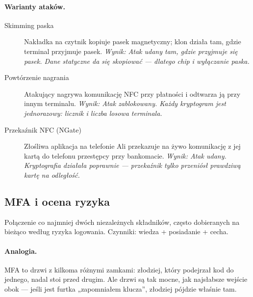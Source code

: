 \paragraph{Warianty ataków.}
\begin{description}
\item[Skimming paska] Nakładka na czytnik kopiuje pasek magnetyczny; klon działa tam, gdzie terminal przyjmuje pasek. \emph{Wynik: Atak udany tam, gdzie przyjmuje się pasek. Dane statyczne da się skopiować — dlatego chip i wyłączanie paska.}
\item[Powtórzenie nagrania] Atakujący nagrywa komunikację NFC przy płatności i odtwarza ją przy innym terminalu. \emph{Wynik: Atak zablokowany. Każdy kryptogram jest jednorazowy: licznik i liczba losowa terminala.}
\item[Przekaźnik NFC (NGate)] Złośliwa aplikacja na telefonie Ali przekazuje na żywo komunikację z jej kartą do telefonu przestępcy przy bankomacie. \emph{Wynik: Atak udany. Kryptografia działała poprawnie — przekaźnik tylko przeniósł prawdziwą kartę na odległość.}
\end{description}

\subsection{MFA i ocena ryzyka}
\label{sec:mech-mfa}
Połączenie co najmniej dwóch niezależnych składników, często dobieranych na bieżąco według ryzyka logowania. Czynniki: wiedza + posiadanie + cecha. \cite{N1,N3,N4,P9,P10,P11,P12,A1}

\paragraph{Analogia.} MFA to drzwi z kilkoma różnymi zamkami: złodziej, który podejrzał kod do jednego, nadal stoi przed drugim. Ale drzwi są tak mocne, jak najsłabsze wejście obok — jeśli jest furtka „zapomniałem klucza”, złodziej pójdzie właśnie tam.

